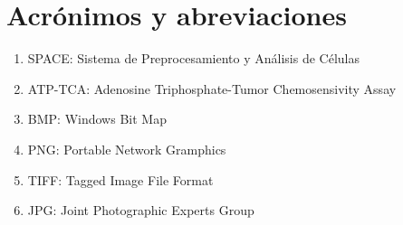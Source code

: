 \documentclass{scrreprt}
\begin{document}
\section{Acrónimos y abreviaciones}

\begin{enumerate}[label=\alph*.]
	\item SPACE: Sistema de Preprocesamiento y Análisis de Células
    \item ATP-TCA: Adenosine Triphosphate-Tumor Chemosensivity Assay
    \item BMP: Windows Bit Map
    \item PNG: Portable Network Gramphics
    \item TIFF: Tagged Image File Format
    \item JPG: Joint Photographic Experts Group
\end{enumerate}
\end{document}
